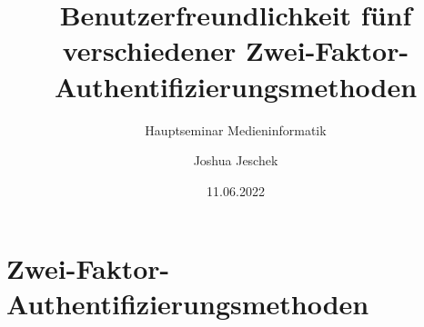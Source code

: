 
\usepackage[T1]{fontenc}
\usepackage[utf8]{inputenc}
\usepackage[ngerman]{babel}




%
%




\newcommand{\Title}{Benutzerfreundlichkeit fünf verschiedener Zwei-Faktor-Authentifizierungsmethoden}
\newcommand{\ShortTitle}{Zwei-Faktor-Authentifizierungsmethoden}
\title[\ShortTitle]{\Title}
\subtitle{Hauptseminar Medieninformatik}
\author{Joshua Jeschek}
\date{11.06.2022}



\tucthreeheadlines{}
\frame{\titlepage}

\tuctwoheadlines{}
\section*{\ShortTitle}
